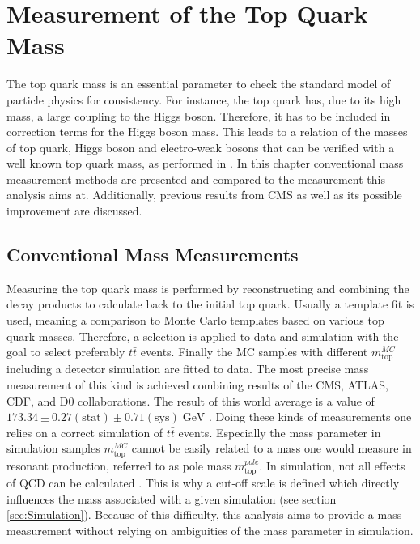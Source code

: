 \chapter{Measurement of the Top Quark Mass}
	The top quark mass is an essential parameter to check the standard model of particle physics for consistency. For instance, the top quark has, due to its high mass, a large coupling to the Higgs boson. Therefore, it has to be included in correction terms for the Higgs boson mass. This leads to a relation of the masses of top quark, Higgs boson and electro-weak bosons that can be verified with a well known top quark mass, as performed in \cite{ewfit}. In this chapter conventional mass measurement methods are presented and compared to the measurement this analysis aims at. Additionally, previous results from CMS as well as its possible improvement are discussed. 
	
\section{Conventional Mass Measurements}
	Measuring the top quark mass is performed by reconstructing and combining the decay products to calculate back to the initial top quark. Usually a template  fit is used, meaning a comparison to Monte Carlo templates based on various top quark masses. Therefore, a selection is applied to data and simulation with the goal to select preferably $t\bar{t}$ events. Finally the MC samples with different $m_\text{top}^{MC}$ including a detector simulation are fitted to data. The most precise mass measurement of this kind is achieved combining results of the CMS, ATLAS, CDF, and D0 collaborations. The result of this world average is a value of $173.34 \pm 0.27 (\text{stat}) \pm 0.71 (\text{sys})\;\text{GeV}$ \cite{topmass_combination}. Doing these kinds of measurements one relies on a correct simulation of $t\bar{t}$ events. Especially the mass parameter in simulation samples $m_\text{top}^{MC}$ cannot be easily related to a mass one would measure in resonant production, referred to as pole mass $m_\text{top}^{pole}$. In simulation, not all effects of QCD can be calculated \cite{nonperturbative}. This is why a cut-off \cite{cutoff} scale is defined which directly influences the mass associated with a given simulation (see section \ref{sec:Simulation}). Because of this difficulty, this analysis aims to provide a mass measurement without relying on ambiguities of the mass parameter in simulation.

